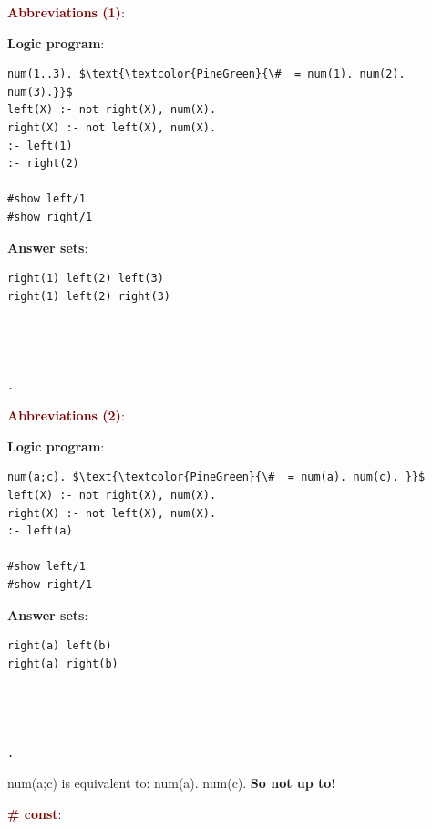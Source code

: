 \newpage
{\Large \textbf{\textcolor{Maroon}{Abbreviations (1)}}}: \\

\begin{minipage}{0.6\textwidth}
\textbf{Logic program}:
\begin{lstlisting}
num(1..3). $\text{\textcolor{PineGreen}{\#  = num(1). num(2). num(3).}}$
left(X) :- not right(X), num(X).
right(X) :- not left(X), num(X).
:- left(1) 
:- right(2)

#show left/1 
#show right/1
\end{lstlisting}
\end{minipage}
\begin{minipage}{0.4\textwidth}
\textbf{Answer sets}:
\begin{lstlisting}
right(1) left(2) left(3)
right(1) left(2) right(3)




.
\end{lstlisting}
\end{minipage}

\vspace{0.35cm}

{\Large \textbf{\textcolor{Maroon}{Abbreviations (2)}}}: \\

\begin{minipage}{0.6\textwidth}
\textbf{Logic program}:
\begin{lstlisting}
num(a;c). $\text{\textcolor{PineGreen}{\#  = num(a). num(c). }}$
left(X) :- not right(X), num(X).
right(X) :- not left(X), num(X).
:- left(a) 

#show left/1 
#show right/1
\end{lstlisting}
\end{minipage}
\begin{minipage}{0.4\textwidth}
\textbf{Answer sets}:
\begin{lstlisting}
right(a) left(b) 
right(a) right(b) 




.
\end{lstlisting}
\end{minipage}

num(a;c) is equivalent to: num(a). num(c). \textbf{So not up to!} \\

\vspace{0.35cm}

{\Large \textbf{\textcolor{Maroon}{\# const}}}: \\

